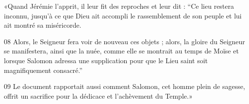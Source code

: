 
«Quand Jérémie l’apprit, il leur fit des reproches et leur dit : “Ce lieu restera inconnu, jusqu’à ce que Dieu ait accompli le rassemblement de son peuple et lui ait montré sa miséricorde.

08 Alors, le Seigneur fera voir de nouveau ces objets ; alors, la gloire du Seigneur se manifestera, ainsi que la nuée, comme elle se montrait au temps de Moïse et lorsque Salomon adressa une supplication pour que le Lieu saint soit magnifiquement consacré.”

09 Le document rapportait aussi comment Salomon, cet homme plein de sagesse, offrit un sacrifice pour la dédicace et l’achèvement du Temple.»